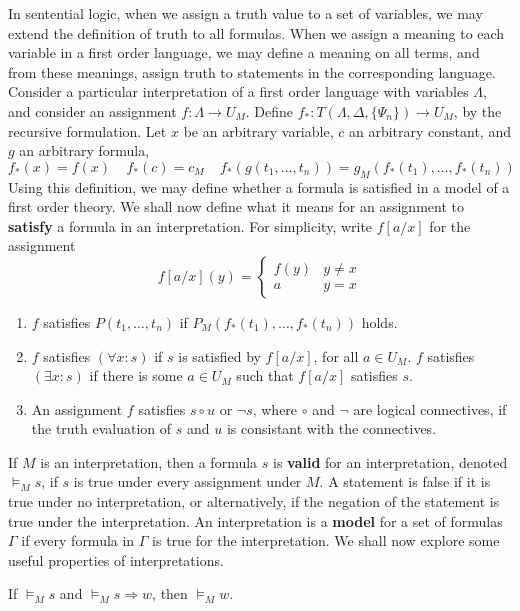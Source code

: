 In sentential logic, when we assign a truth value to a set of variables, we may extend the definition of truth to all formulas. When we assign a meaning to each variable in a first order language, we may define a meaning on all terms, and from these meanings, assign truth to statements in the corresponding language. Consider a particular interpretation of a first order language with variables $\Lambda$, and consider an assignment $f: \Lambda \to U_M$. Define $f_*: T(\Lambda, \Delta, \{ \Psi_n \}) \to U_M$, by the recursive formulation. Let $x$ be an arbitrary variable, $c$ an arbitrary constant, and $g$ an arbitrary formula,
%
\[ f_*(x) = f(x)\ \ \ \ \ f_*(c) = c_M\ \ \ \ \ f_*(g(t_1, \dots, t_n)) = g_M(f_*(t_1), \dots, f_*(t_n)) \]
%
Using this definition, we may define whether a formula is satisfied in a model of a first order theory. We shall now define what it means for an assignment to {\bf satisfy} a formula in an interpretation. For simplicity, write $f[a/x]$ for the assignment
%
\[ f[a/x](y) = \begin{cases} f(y) & y \neq x \\ a & y = x \end{cases} \]
%
\begin{enumerate}
    \item $f$ satisfies $P(t_1, \dots, t_n)$ if $P_M(f_*(t_1), \dots, f_*(t_n))$ holds.
    \item $f$ satisfies $(\forall x: s)$ if $s$ is satisfied by $f[a/x]$, for all $a \in U_M$. $f$ satisfies $(\exists x: s)$ if there is some $a \in U_M$ such that $f[a/x]$ satisfies $s$.
    \item An assignment $f$ satisfies $s \circ u$ or $\neg s$, where $\circ$ and $\neg$ are logical connectives, if the truth evaluation of $s$ and $u$ is consistant with the connectives.
\end{enumerate}
%
If $M$ is an interpretation, then a formula $s$ is {\bf valid} for an interpretation, denoted $\vDash_M s$, if $s$ is true under every assignment under $M$. A statement is false if it is true under no interpretation, or alternatively, if the negation of the statement is true under the interpretation. An interpretation is a {\bf model} for a set of formulas $\Gamma$ if every formula in $\Gamma$ is true for the interpretation. We shall now explore some useful properties of interpretations.

\begin{lemma} If $\vDash_M s$ and $\vDash_M s \Rightarrow w$, then $\vDash_M w$. \end{lemma}

